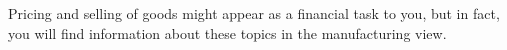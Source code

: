 Pricing and selling of goods might appear as a financial task to you, but in fact, you will find information about these topics in the manufacturing view.\\ 


